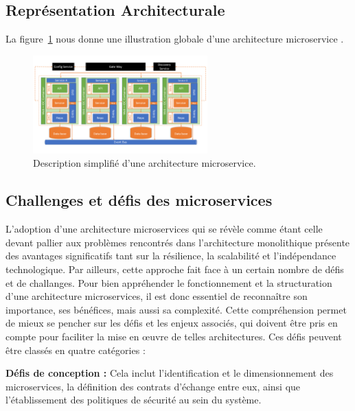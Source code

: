 \documentclass[a4paper,12pt]{report}
\begin{document}
\subsection{Représentation Architecturale}

La figure~\ref{fig:rep_archi} nous donne une illustration globale d'une architecture microservice \cite{mohamed_yousffi_archi}.

\begin{figure}[H]
\centering
\includegraphics[width=0.6\textwidth]{images/representaton_architecturale_ms.png}
\caption{Description simplifié d'une architecture microservice.}
\label{fig:rep_archi}
\end{figure}

\subsection{Challenges et défis des microservices}

L'adoption d'une architecture microservices qui se révèle comme étant celle devant pallier aux problèmes rencontrés dans l'architecture monolithique présente des avantages significatifs tant sur la résilience, la scalabilité et l'indépendance technologique. Par ailleurs, cette approche fait face à un certain nombre de défis et de challanges. Pour bien appréhender le fonctionnement et la structuration d'une architecture microservices, il est donc essentiel de reconnaître son importance, ses bénéfices, mais aussi sa complexité. Cette compréhension permet de mieux se pencher sur les défis et les enjeux associés, qui doivent être pris en compte pour faciliter la mise en œuvre de telles architectures. Ces défis peuvent être classés en quatre catégories \cite{_defis_bares_garriga_2020, _defis_wizenty_sorgalla_rademacher_sachweh_2017}:

\textbf{Défis de conception :} Cela inclut l'identification et le dimensionnement des microservices, la définition des contrats d'échange entre eux, ainsi que l'établissement des politiques de sécurité au sein du système.
\end{document}
